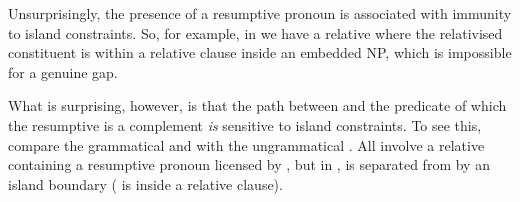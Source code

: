 \documentclass[output=paper,biblatex,babelshorthands,newtxmath,draftmode,colorlinks,citecolor=brown]{langscibook}
\begin{document}
Unsurprisingly, the presence of a resumptive pronoun is associated with immunity to island
constraints. So, for example, in  we have a relative where the relativised constituent is within a relative clause inside an embedded NP, which is 
impossible for a genuine gap.
\begin{exe}
\end{exe}

\largerpage[-2]
\noindent
What is surprising, however, is that the path between  and the predicate of
which the resumptive is a complement \emph{is} sensitive to island constraints. To see this, compare
the grammatical  and  with the ungrammatical
. All involve a  relative containing a resumptive pronoun
licensed by , but in ,
 is separated from  by an island boundary ( is inside a relative clause).
\begin{exe}
  \label{x:rc-171}
\end{exe}
\end{document}
